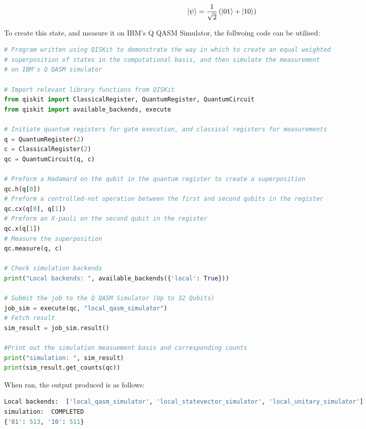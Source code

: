 \begin{equation}
    \left\vert{\psi}\right\rangle=\frac{1}{\sqrt{2}}\left(\left\vert{01}\right\rangle+\left\vert{10}\right\rangle\right)
    \label{eq:BS}
\end{equation} 

To create this state, and measure it on IBM's Q QASM Simulator, the follwoing code can be utilised:
\newpage

\begin{lstlisting}[language=Python,caption={Example algorithm implemented with QISKit.},label={lst:ExampleQQASM},frame=single] 
# Program written using QISKit to demonstrate the way in which to create an equal weighted
# superposition of states in the computational basis, and then simulate the measurement
# on IBM's Q QASM simulator

# Import relevant library functions from QISKit
from qiskit import ClassicalRegister, QuantumRegister, QuantumCircuit
from qiskit import available_backends, execute

# Initiate quantum registers for gate execution, and classical registers for measurements
q = QuantumRegister(2)
c = ClassicalRegister(2)
qc = QuantumCircuit(q, c)

# Preform a Hadamard on the qubit in the quantum register to create a superposition
qc.h(q[0])
# Preform a controlled-not operation between the first and second qubits in the register
qc.cx(q[0], q[1])
# Preform an X-pauli on the second qubit in the register
qc.x(q[1])
# Measure the superposition
qc.measure(q, c)

# Check simulation backends
print("Local backends: ", available_backends({'local': True}))

# Submit the job to the Q QASM Simulator (Up to 32 Qubits)
job_sim = execute(qc, "local_qasm_simulator")
# Fetch result
sim_result = job_sim.result()

#Print out the simulation measuement basis and corresponding counts
print("simulation: ", sim_result)
print(sim_result.get_counts(qc))
\end{lstlisting}

When ran, the output produced is as follows:

\begin{lstlisting}[language=Python,caption={Bell State generation and measurement output.},label={lst:ExampleQQASMoutput},frame=single] 
Local backends:  ['local_qasm_simulator', 'local_statevector_simulator', 'local_unitary_simulator']
simulation:  COMPLETED
{'01': 513, '10': 511}
\end{lstlisting}

